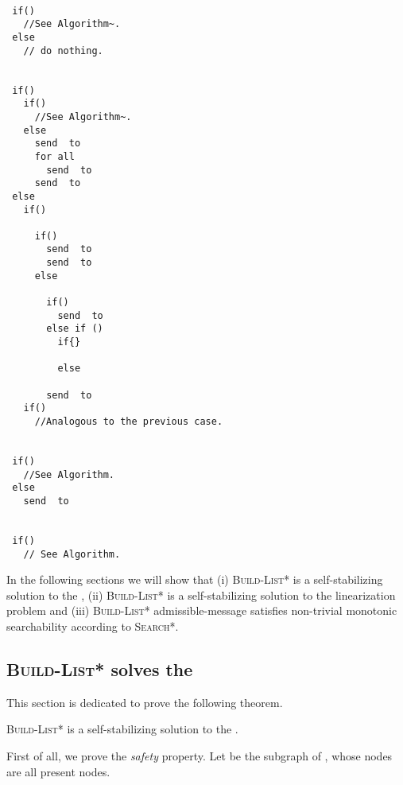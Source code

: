 \documentclass[a4paper,USenglish]{lipics}
\newcommand{\blpp}{\textsc{Build-List*}\xspace}
\newcommand{\srpp}{\textsc{Search*}\xspace}
\newcommand{\fdp}{\xspace}
\begin{document}
\newpage
\begin{lstlisting}[mathescape=true,caption=\srpp protocol,label=algo:search2]

 if() 
   //See Algorithm~.
 else
   // do nothing.  


 if()
   if() 
     //See Algorithm~.
   else
     send  to 
     for all  
       send  to 
     send  to 
 else
   if()
     
     if()
       send  to 
       send  to 
     else
       
       if()
         send  to 
       else if ()
         if{}
           
         else
           
       send  to 
   if() 
     //Analogous to the previous case.


 if() 
   //See Algorithm.
 else
   send  to 


 if() 
   // See Algorithm.
\end{lstlisting}

In the following sections we will show that (i) \blpp is a self-stabilizing solution to the \fdp, (ii) \blpp is a self-stabilizing solution to the linearization problem and (iii) \blpp admissible-message satisfies non-trivial monotonic searchability according to \srpp.

\subsection{\blpp solves the \fdp}
\label{sec:FDP_solution_proof}
This section is dedicated to prove the following theorem.

\begin{theorem}\label{thm:blpp_solves_fdp}
 \blpp is a self-stabilizing solution to the \fdp.
\end{theorem}

First of all, we prove the \emph{safety} property. Let  be the subgraph of , whose nodes are all present nodes. 
\end{document}
